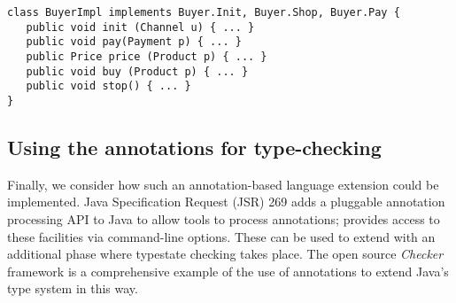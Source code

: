 \begin{lstlisting}
class BuyerImpl implements Buyer.Init, Buyer.Shop, Buyer.Pay {
   public void init (Channel u) { ... }
   public void pay(Payment p) { ... }
   public Price price (Product p) { ... }
   public void buy (Product p) { ... }
   public void stop() { ... }
}
\end{lstlisting}

\subsection{Using the annotations for type-checking}

Finally, we consider how such an annotation-based language extension
could be implemented. Java Specification Request (JSR) 269
\cite{jsr269} adds a pluggable annotation processing API to Java to
allow tools to process annotations;  provides access to
these facilities via command-line options. These can be used to extend
 with an additional phase where typestate checking takes
place. The open source \emph{Checker} framework \cite{papi08,dietl11}
is a comprehensive example of the use of annotations to extend Java's
type system in this way.
